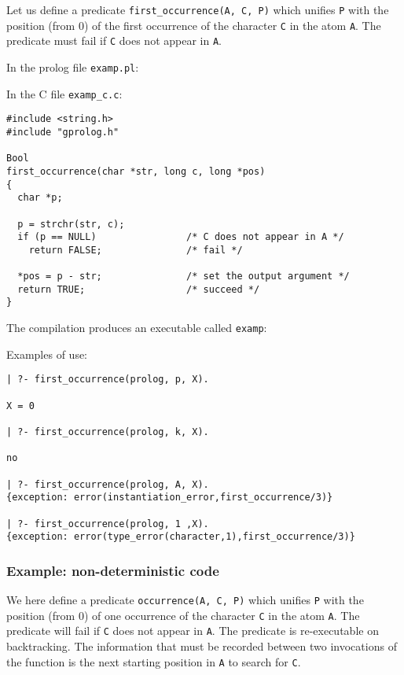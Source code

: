 Let us define a predicate \texttt{first\_occurrence(A, C, P)} which unifies
\texttt{P} with the position (from 0) of the first occurrence of the
character \texttt{C} in the atom \texttt{A}. The predicate must fail if
\texttt{C} does not appear in \texttt{A}.

In the prolog file \texttt{examp.pl}:


In the C file \texttt{examp\_c.c}:

\begin{Indentation}
\begin{verbatim}
#include <string.h>
#include "gprolog.h"

Bool
first_occurrence(char *str, long c, long *pos)
{
  char *p;

  p = strchr(str, c);
  if (p == NULL)                /* C does not appear in A */
    return FALSE;               /* fail */

  *pos = p - str;               /* set the output argument */
  return TRUE;                  /* succeed */
}
\end{verbatim}
\end{Indentation}

The compilation produces an executable called \texttt{examp}:


Examples of use:

\begin{Indentation}
\begin{verbatim}
| ?- first_occurrence(prolog, p, X).

X = 0

| ?- first_occurrence(prolog, k, X).

no

| ?- first_occurrence(prolog, A, X).
{exception: error(instantiation_error,first_occurrence/3)}

| ?- first_occurrence(prolog, 1 ,X).
{exception: error(type_error(character,1),first_occurrence/3)}
\end{verbatim}
\end{Indentation}

\subsubsection{Example: non-deterministic code}
We here define a predicate \texttt{occurrence(A, C, P)} which unifies
\texttt{P} with the position (from 0) of one occurrence of the character
\texttt{C} in the atom \texttt{A}. The predicate will fail if \texttt{C}
does not appear in \texttt{A}. The predicate is re-executable on
backtracking. The information that must be recorded between two invocations
of the function is the next starting position in \texttt{A} to search for
\texttt{C}.


